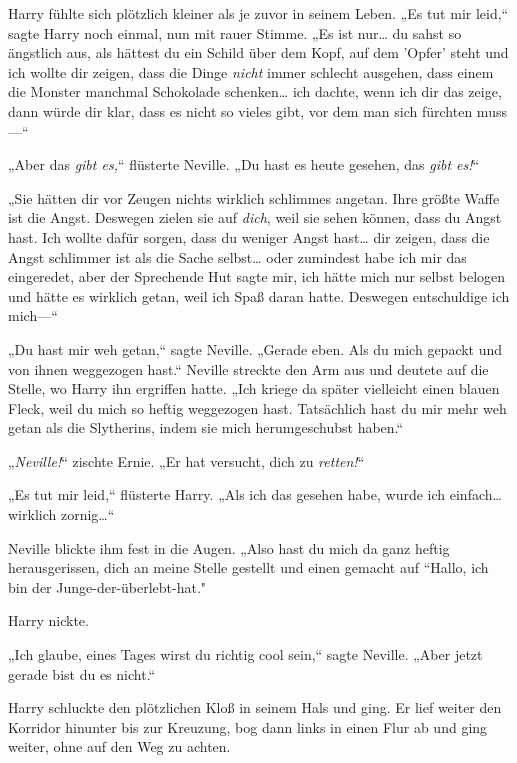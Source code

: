 {Harry fühlte sich plötzlich kleiner als je zuvor in seinem Leben. „Es tut mir leid,“ sagte Harry noch einmal, nun mit rauer Stimme. „Es ist nur… du sahst so ängstlich aus, als hättest du ein Schild über dem Kopf, auf dem 'Opfer' steht und ich wollte dir zeigen, dass die Dinge \emph{nicht} immer schlecht ausgehen, dass einem die Monster manchmal Schokolade schenken… ich dachte, wenn ich dir das zeige, dann würde dir klar, dass es nicht so vieles gibt, vor dem man sich fürchten muss—“

„Aber das \emph{gibt es,}“ flüsterte Neville. „Du hast es heute gesehen, das \emph{gibt es!}“

„Sie hätten dir vor Zeugen nichts wirklich schlimmes angetan. Ihre größte Waffe ist die Angst. Deswegen zielen sie auf \emph{dich}, weil sie sehen können, dass du Angst hast. Ich wollte dafür sorgen, dass du weniger Angst hast… dir zeigen, dass die Angst schlimmer ist als die Sache selbst… oder zumindest habe ich mir das eingeredet, aber der Sprechende Hut sagte mir, ich hätte mich nur selbst belogen und hätte es wirklich getan, weil ich Spaß daran hatte. Deswegen entschuldige ich mich—“

„Du hast mir weh getan,“ sagte Neville. „Gerade eben. Als du mich gepackt und von ihnen weggezogen hast.“ Neville streckte den Arm aus und deutete auf die Stelle, wo Harry ihn ergriffen hatte. „Ich kriege da später vielleicht einen blauen Fleck, weil du mich so heftig weggezogen hast. Tatsächlich hast du mir mehr weh getan als die Slytherins, indem sie mich herumgeschubst haben.“

„\emph{Neville!}“ zischte Ernie. „Er hat versucht, dich zu \emph{retten!}“

„Es tut mir leid,“ flüsterte Harry. „Als ich das gesehen habe, wurde ich einfach… wirklich zornig…“

Neville blickte ihm fest in die Augen. „Also hast du mich da ganz heftig herausgerissen, dich an meine Stelle gestellt und einen gemacht auf “Hallo, ich bin der Junge-der-überlebt-hat."

Harry nickte.

„Ich glaube, eines Tages wirst du richtig cool sein,“ sagte Neville. „Aber jetzt gerade bist du es nicht.“

Harry schluckte den plötzlichen Kloß in seinem Hals und ging. Er lief weiter den Korridor hinunter bis zur Kreuzung, bog dann links in einen Flur ab und ging weiter, ohne auf den Weg zu achten.

}

